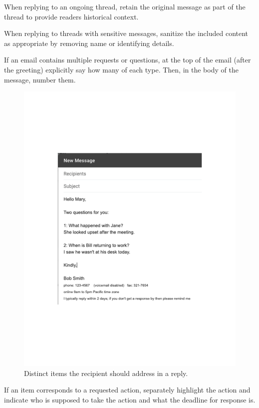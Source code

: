 When replying to an ongoing thread, retain the original message as part of the thread to provide readers historical context.

When replying to threads with sensitive messages, sanitize the included content as appropriate by removing name or identifying details.

If an email contains multiple requests or questions, at the top of the email (after the greeting) explicitly say how many of each type. Then, in the body of the message, number them.

\begin{figure}
\includegraphics[width=1\textwidth]{images/email_two_questions.pdf}
\caption{Distinct items the recipient should address in a reply.}
\label{fig:email_two_questions}
\end{figure}

If an item corresponds to a requested action, separately highlight the action and indicate who is supposed to take the action and what the deadline for response is.

